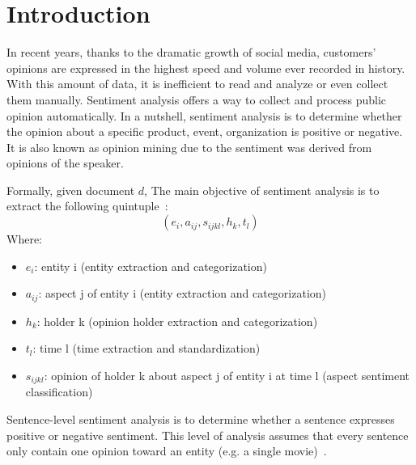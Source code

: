 \section{Introduction}
In recent years, thanks to the dramatic growth of social media, customers' opinions are expressed in the highest speed and volume ever recorded in history.
With this amount of data, it is inefficient to read and analyze or even collect them manually. 
Sentiment analysis offers a way to collect and process public opinion automatically.
In a nutshell, sentiment analysis is to determine whether the opinion about a specific product, event, organization is positive or negative. 
It is also known as opinion mining due to the sentiment was derived from opinions of the speaker.

Formally, given document $d$, The main objective of sentiment analysis is to extract the following quintuple~\cite{liu2012sentiment}:
\[ ( e_{i}, a_{ij}, s_{ijkl}, h_{k}, t_{l} ) \]
Where:
\begin{itemize}
	\item $e_{i}$: entity i (entity extraction and categorization)
	\item $a_{ij}$: aspect j of entity i (entity extraction and categorization)
	\item $h_{k}$: holder k (opinion holder extraction and categorization)
	\item $t_{l}$: time l (time extraction and standardization)
	\item $s_{ijkl}$: opinion of holder k about aspect j of entity i at time l (aspect sentiment classification)
\end{itemize}
Sentence-level sentiment analysis is to determine whether a sentence expresses positive or negative sentiment. 
This level of analysis assumes that every sentence only contain one opinion toward an entity (e.g. a single movie)~\cite{liu2012sentiment}.

